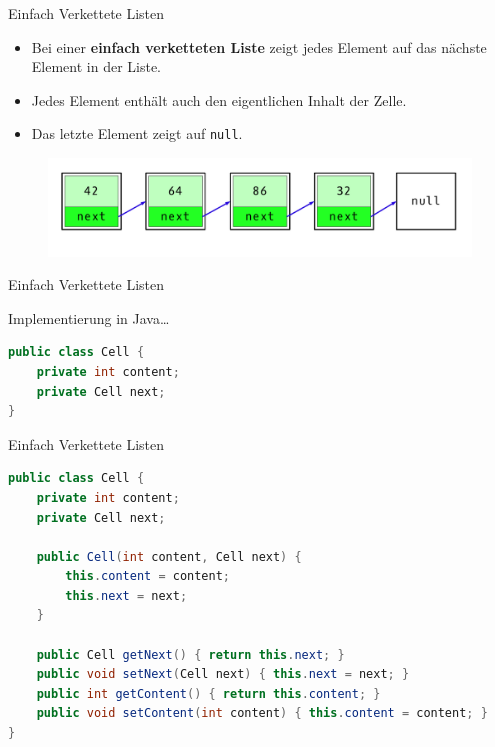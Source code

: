 \documentclass[18pt]{beamer}
\begin{document}
\begin{frame}{Einfach Verkettete Listen}

    \begin{itemize}
        \item Bei einer \textbf{einfach verketteten Liste} zeigt jedes Element auf das nächste Element in der Liste.
        \item Jedes Element enthält auch den eigentlichen Inhalt der Zelle.
        \item Das letzte Element zeigt auf \texttt{null}.
    \end{itemize}

    \begin{figure}
        \includegraphics[scale=.3]{img/simplelinkedlist.png}
    \end{figure}

\end{frame}

\begin{frame}[fragile]{Einfach Verkettete Listen}

    Implementierung in Java\dots

    \begin{exampleblock}{}
        \begin{lstlisting}[language=Java,basicstyle=\scriptsize]
public class Cell {
    private int content;
    private Cell next;
}
        \end{lstlisting}
    \end{exampleblock}

\end{frame}

\begin{frame}[fragile]{Einfach Verkettete Listen}

    \begin{exampleblock}{}
        \begin{lstlisting}[language=Java,basicstyle=\scriptsize]
public class Cell {
    private int content;
    private Cell next;

    public Cell(int content, Cell next) {
        this.content = content;
        this.next = next;
    }

    public Cell getNext() { return this.next; }
    public void setNext(Cell next) { this.next = next; }
    public int getContent() { return this.content; }
    public void setContent(int content) { this.content = content; }
}
        \end{lstlisting}
    \end{exampleblock}

\end{frame}
\end{document}
